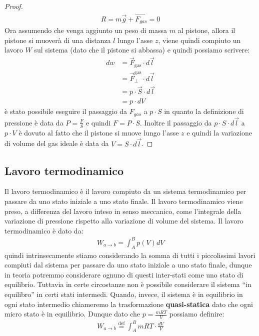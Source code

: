 \begin{proof}
            \begin{align*}
                R = m\vec{g} + \vec{F_{gas}} = 0
            \end{align*}
            Ora assumendo che venga aggiunto un peso di massa $m$ al pistone, allora il pistone si muoverà di una distanza $l$ lungo l'asse $z$, viene quindi compiuto un lavoro $W$ sul sistema (dato che il pistone si abbassa) e quindi possiamo scrivere:
            \begin{align*}
                dw &= \vec{F}_{\text{gas}} \cdot d\vec{l} \\
                &= \vec{F}^{\text{gas}}_{\perp} \cdot d\vec{l} \\
                &= p \cdot \vec{S} \cdot d\vec{l} \\
                &= p \cdot dV
            \end{align*}
            è stato possibile eseguire il passaggio da $F_{gas}$ a $p\cdot S$ in quanto la definizione di pressione è data da $P=\frac{F}{S}$ e quindi $F=P\cdot S$. Inoltre il passaggio da $p\cdot S \cdot d\vec{l}$ a $p\cdot V$ è dovuto al fatto che il pistone si muove lungo l'asse $z$ e quindi la variazione di volume del gas ideale è data da $V=S\cdot d\vec{l}$.
        \end{proof}
    \subsection{Lavoro termodinamico}
        Il lavoro termodinamico è il lavoro compiuto da un sistema termodinamico per passare da uno stato iniziale a uno stato finale. Il lavoro termodinamico viene preso, a differenza del lavoro inteso in senso meccanico, come l'integrale della variazione di pressione rispetto alla variazione di volume del sistema. Il lavoro termodinamico è dato da:
        \begin{align}
            W_{a\rightarrow b}=\int_{A}^{B} p(V) dV
        \end{align}
        quindi intrinsecamente stiamo considerando la somma di tutti i piccolissimi lavori compiuti dal sistema per passare da uno stato iniziale a uno stato finale, dunque in teoria potremmo considerare ognuno di questi inter-stati come uno stato di equilibrio. Tuttavia in certe circostanze non è possibile considerare il sistema ``in equilibro'' in certi stati intermedi. Quando, invece, il sistema è in equilibrio in ogni stato intermedio chiameremo la trasformazione \textbf{quasi-statica} dato che ogni micro stato è in equilibrio. Dunque dato che $p=\frac{mRT}{V}$ possiamo definire:
        \begin{align}
            W_{a\rightarrow b}\stackrel{\operatorname{def}}{=}\int_{A}^{B} mRT \cdot \frac{dV}{V}
        \end{align}

